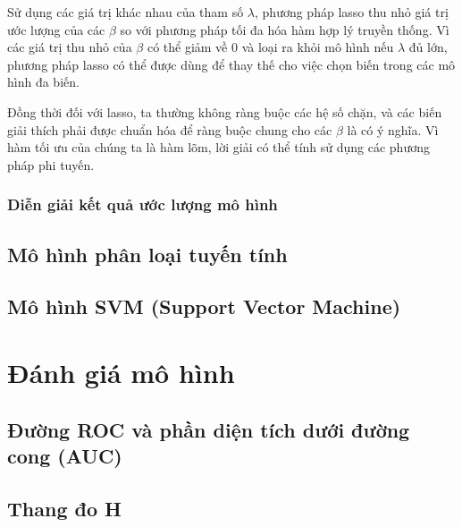 \documentclass[a4paper]{report}\usepackage[]{graphicx}\usepackage[]{color}
\begin{document}
Sử dụng các giá trị khác nhau của tham số $\lambda$, phương pháp lasso thu nhỏ giá trị ước lượng của các $\beta$ so với phương pháp tối đa hóa hàm hợp lý truyền thống. Vì các giá trị thu nhỏ của $\beta$ có thể giảm về 0 và loại ra khỏi mô hình nếu $\lambda$ đủ lớn, phương pháp lasso có thể được dùng để thay thế cho việc chọn biến trong các mô hình đa biến.

Đồng thời đối với lasso, ta thường không ràng buộc các hệ số chặn, và các biến giải thích phải được chuẩn hóa để ràng buộc chung cho các $\beta$ là có ý nghĩa. Vì hàm tối ưu của chúng ta là hàm lõm, lời giải có thể tính sử dụng các phương pháp phi tuyến. %


\subsubsection{Diễn giải kết quả ước lượng mô hình}

\subsection{Mô hình phân loại tuyến tính}
\subsection{Mô hình SVM (Support Vector Machine)}

\section{Đánh giá mô hình}
\subsection{Đường ROC và phần diện tích dưới đường cong (AUC)}
\subsection{Thang đo H}
\end{document}
